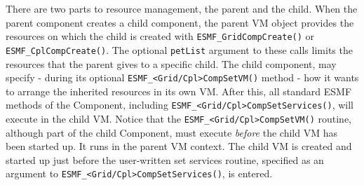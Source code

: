There are two parts to resource management, the parent and the child. When the parent component creates a child component, the parent VM object provides the resources on which the child is created with {\tt ESMF\_GridCompCreate()} or {\tt ESMF\_CplCompCreate()}. The optional {\tt petList} argument to these calls limits the resources that the parent gives to a specific child. The child component, may specify - during its optional 
{\tt ESMF\_<Grid/Cpl>CompSetVM()} method - how it wants to arrange the inherited resources in its own VM. After this, all standard ESMF methods of the Component, including {\tt ESMF\_<Grid/Cpl>CompSetServices()}, will execute in the child VM. Notice that the {\tt ESMF\_<Grid/Cpl>CompSetVM()} routine, although part of the child Component, must execute {\em before} the child VM has been started up. It runs in the parent VM context. The child VM is created and started up just before the user-written set services routine, specified as an argument to {\tt ESMF\_<Grid/Cpl>CompSetServices()}, is entered.
